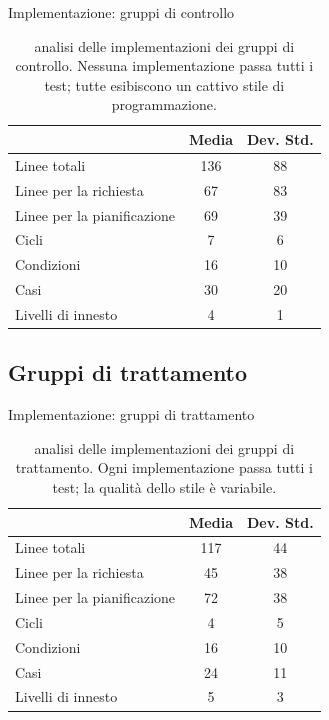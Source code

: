 \documentclass{beamer}
\begin{document}
\begin{frame}{Implementazione: gruppi di controllo}
	\begin{table}
		\begin{tabular}{|l|c|c|}
			\hline
			                            & Media & Dev. Std. \\
			\hline
			Linee totali                & 136   & 88        \\
			\hline
			Linee per la richiesta      & 67    & 83        \\
			\hline
			Linee per la pianificazione & 69    & 39        \\
			\hline
			Cicli                       & 7     & 6         \\
			\hline
			Condizioni                  & 16    & 10        \\
			\hline
			Casi                        & 30    & 20        \\
			\hline
			Livelli di innesto          & 4     & 1         \\
			\hline
		\end{tabular}
		\caption{analisi delle implementazioni dei gruppi di controllo. Nessuna
			implementazione passa tutti i test; tutte esibiscono un cattivo stile di
			programmazione.}
	\end{table}
\end{frame}

\subsection{Gruppi di trattamento}
\begin{frame}{Implementazione: gruppi di trattamento}
	\begin{table}
		\begin{tabular}{|l|c|c|}
			\hline
			                            & Media & Dev. Std. \\
			\hline
			Linee totali                & 117   & 44        \\
			\hline
			Linee per la richiesta      & 45    & 38        \\
			\hline
			Linee per la pianificazione & 72    & 38        \\
			\hline
			Cicli                       & 4     & 5         \\
			\hline
			Condizioni                  & 16    & 10        \\
			\hline
			Casi                        & 24    & 11        \\
			\hline
			Livelli di innesto          & 5     & 3         \\
			\hline
		\end{tabular}
		\caption{analisi delle implementazioni dei gruppi di trattamento. Ogni
			implementazione passa tutti i test; la qualità dello stile è variabile.}
	\end{table}
\end{frame}
\end{document}
